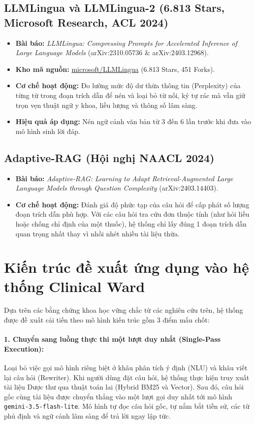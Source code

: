 \documentclass[12pt,a4paper]{article}
\begin{document}
\subsection{LLMLingua và LLMLingua-2 (6.813 Stars, Microsoft Research, ACL 2024)}
\begin{itemize}[leftmargin=1.5em]
    \item \textbf{Bài báo:} \textit{LLMLingua: Compressing Prompts for Accelerated Inference of Large Language Models} (arXiv:2310.05736 \& arXiv:2403.12968).
    \item \textbf{Kho mã nguồn:} \href{https://github.com/microsoft/LLMLingua}{microsoft/LLMLingua} (6.813 Stars, 451 Forks).
    \item \textbf{Cơ chế hoạt động:} Đo lường mức độ dư thừa thông tin (Perplexity) của từng từ trong đoạn trích dẫn để nén và loại bỏ từ nối, ký tự rác mà vẫn giữ trọn vẹn thuật ngữ y khoa, liều lượng và thông số lâm sàng.
    \item \textbf{Hiệu quả áp dụng:} Nén ngữ cảnh văn bản từ 3 đến 6 lần trước khi đưa vào mô hình sinh lời đáp.
\end{itemize}

\subsection{Adaptive-RAG (Hội nghị NAACL 2024)}
\begin{itemize}[leftmargin=1.5em]
    \item \textbf{Bài báo:} \textit{Adaptive-RAG: Learning to Adapt Retrieval-Augmented Large Language Models through Question Complexity} (arXiv:2403.14403).
    \item \textbf{Cơ chế hoạt động:} Đánh giá độ phức tạp của câu hỏi để cấp phát số lượng đoạn trích dẫn phù hợp. Với các câu hỏi tra cứu đơn thuộc tính (như hỏi liều hoặc chống chỉ định của một thuốc), hệ thống chỉ lấy đúng 1 đoạn trích dẫn quan trọng nhất thay vì nhồi nhét nhiều tài liệu thừa.
\end{itemize}

\section{Kiến trúc đề xuất ứng dụng vào hệ thống Clinical Ward}

Dựa trên các bằng chứng khoa học vững chắc từ các nghiên cứu trên, hệ thống được đề xuất cải tiến theo mô hình kiến trúc gồm 3 điểm mấu chốt:

\paragraph{1. Chuyển sang luồng thực thi một lượt duy nhất (Single-Pass Execution):}
Loại bỏ việc gọi mô hình riêng biệt ở khâu phân tích ý định (NLU) và khâu viết lại câu hỏi (Rewriter). Khi người dùng đặt câu hỏi, hệ thống thực hiện truy xuất tài liệu Dược thư qua thuật toán lai (Hybrid BM25 và Vector). Sau đó, câu hỏi gốc cùng tài liệu được chuyển thẳng vào một lượt gọi duy nhất tới mô hình \texttt{gemini-3.5-flash-lite}. Mô hình tự đọc câu hỏi gốc, tự nắm bắt tiền sử, các từ phủ định và ngữ cảnh lâm sàng để trả lời ngay lập tức.
\end{document}

